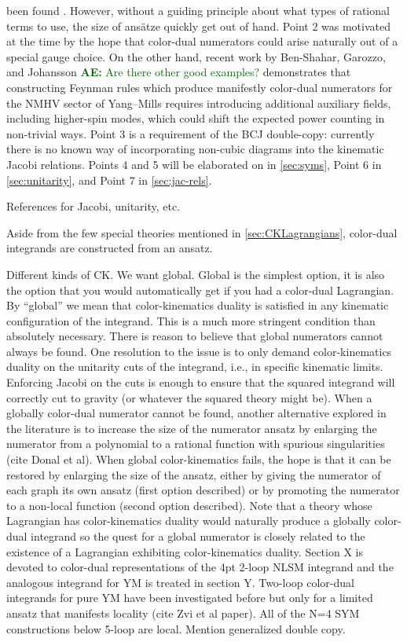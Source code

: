 \documentclass[11pt,letter]{article}
\newcommand{\ace}[1]{\textcolor{darkgreen}{\textbf{AE:}{ #1}}}
\begin{document}
been found
\cite{Square,WeinzierlBCJLagrangian,Mogull:2015adi,FivePointN4BCJ,Johansson:2017bfl}.
However, without a guiding principle about what types of rational
terms to use, the size of ans\"{a}tze quickly get out of hand.  Point
2 was motivated at the time by the hope that color-dual numerators
could arise naturally out of a special gauge choice.  On the other hand, recent
work by Ben-Shahar, Garozzo, and Johansson \cite{Ben-Shahar:2022ixa}
\ace{Are there other good examples?}  demonstrates that constructing
Feynman rules which produce manifestly color-dual numerators for the
NMHV sector of Yang--Mills requires introducing additional auxiliary
fields, including higher-spin modes, which could shift the expected
power counting in non-trivial ways.  Point 3 is a requirement of the
BCJ double-copy: currently there is no known way of incorporating
non-cubic diagrams into the kinematic Jacobi relations.  Points 4 and
5 will be elaborated on in \cref{sec:syms}, Point 6 in
\cref{sec:unitarity}, and Point 7 in \cref{sec:jac-rels}.


References for Jacobi, unitarity, etc.

Aside from the few special theories mentioned in \cref{sec:CKLagrangians}, color-dual integrands are constructed from an ansatz.

Different kinds of CK.  We want global.  Global is the simplest
option, it is also the option that you would automatically get if you
had a color-dual Lagrangian.  By ``global'' we mean that
color-kinematics duality is satisfied in any kinematic configuration
of the integrand.  This is a much more stringent condition than
absolutely necessary.  There is reason to believe \cite{Bern:2015ooa} that global numerators cannot
always be found.  One resolution to the issue is to only demand
color-kinematics duality on the unitarity cuts of the integrand, i.e.,
in specific kinematic limits.  Enforcing Jacobi on the cuts is enough
to ensure that the squared integrand will correctly cut to gravity (or
whatever the squared theory might be).  When a globally color-dual
numerator cannot be found, another alternative explored in the
literature is to increase the size of the numerator ansatz by
enlarging the numerator from a polynomial to a rational function with
spurious singularities (cite Donal et al).  When global
color-kinematics fails, the hope is that it can be restored by
enlarging the size of the ansatz, either by giving the numerator of
each graph its own ansatz (first option described) or by promoting the
numerator to a non-local function (second option described).  Note
that a theory whose Lagrangian has color-kinematics duality would
naturally produce a globally color-dual integrand so the quest for a
global numerator is closely related to the existence of a Lagrangian
exhibiting color-kinematics duality.  Section X is devoted to
color-dual representations of the 4pt 2-loop NLSM integrand and the
analogous integrand for YM is treated in section Y.  Two-loop
color-dual integrands for pure YM have been investigated before but
only for a limited ansatz that manifests locality (cite Zvi et al
paper).  All of the N=4 SYM constructions below 5-loop are local.
Mention generalized double copy.
\end{document}
